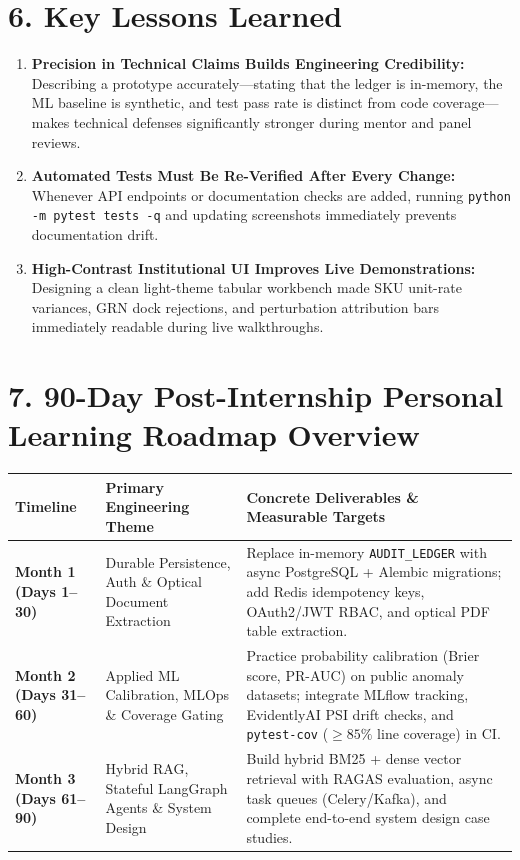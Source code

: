 \documentclass[a4paper,10pt]{article}
\begin{document}
\newpage
\section{6. Key Lessons Learned}
\begin{enumerate}[leftmargin=0.22in, itemsep=4pt]
    \item \textbf{Precision in Technical Claims Builds Engineering Credibility:} Describing a prototype accurately---stating that the ledger is in-memory, the ML baseline is synthetic, and test pass rate is distinct from code coverage---makes technical defenses significantly stronger during mentor and panel reviews.
    \item \textbf{Automated Tests Must Be Re-Verified After Every Change:} Whenever API endpoints or documentation checks are added, running \texttt{python -m pytest tests -q} and updating screenshots immediately prevents documentation drift.
    \item \textbf{High-Contrast Institutional UI Improves Live Demonstrations:} Designing a clean light-theme tabular workbench made SKU unit-rate variances, GRN dock rejections, and perturbation attribution bars immediately readable during live walkthroughs.
\end{enumerate}

\section{7. 90-Day Post-Internship Personal Learning Roadmap Overview}
\begin{tabularx}{\textwidth}{@{}p{1.25in}p{1.85in}X@{}}
\toprule
\textbf{Timeline} & \textbf{Primary Engineering Theme} & \textbf{Concrete Deliverables \& Measurable Targets} \\
\midrule
\textbf{Month 1 (Days 1--30)} & Durable Persistence, Auth \& Optical Document Extraction & Replace in-memory \texttt{AUDIT\_LEDGER} with async PostgreSQL + Alembic migrations; add Redis idempotency keys, OAuth2/JWT RBAC, and optical PDF table extraction. \\
\addlinespace[4pt]
\textbf{Month 2 (Days 31--60)} & Applied ML Calibration, MLOps \& Coverage Gating & Practice probability calibration (Brier score, PR-AUC) on public anomaly datasets; integrate MLflow tracking, EvidentlyAI PSI drift checks, and \texttt{pytest-cov} ($\ge 85\%$ line coverage) in CI. \\
\addlinespace[4pt]
\textbf{Month 3 (Days 61--90)} & Hybrid RAG, Stateful LangGraph Agents \& System Design & Build hybrid BM25 + dense vector retrieval with RAGAS evaluation, async task queues (Celery/Kafka), and complete end-to-end system design case studies. \\
\bottomrule
\end{tabularx}
\end{document}
